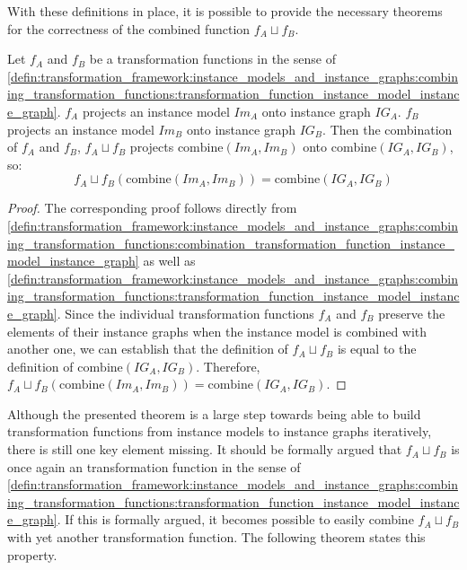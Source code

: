 With these definitions in place, it is possible to provide the necessary theorems for the correctness of the combined function $f_{A} \sqcup f_{B}$.

\begin{thm}
\label{defin:transformation_framework:instance_models_and_instance_graphs:combining_transformation_functions:ig_combine_mapping_correct}
Let $f_A$ and $f_B$ be a transformation functions in the sense of \cref{defin:transformation_framework:instance_models_and_instance_graphs:combining_transformation_functions:transformation_function_instance_model_instance_graph}. $f_A$ projects an instance model $Im_A$ onto instance graph $IG_A$. $f_B$ projects an instance model $Im_B$ onto instance graph $IG_B$. Then the combination of $f_A$ and $f_B$, $f_{A} \sqcup f_{B}$ projects $\mathrm{combine}(Im_A, Im_B)$ onto $\mathrm{combine}(IG_A, IG_B)$, so:
\begin{equation*}
    f_{A} \sqcup f_{B}(\mathrm{combine}(Im_A, Im_B)) = \mathrm{combine}(IG_A, IG_B)
\end{equation*}
\end{thm}

\begin{proof}
The corresponding proof follows directly from \cref{defin:transformation_framework:instance_models_and_instance_graphs:combining_transformation_functions:combination_transformation_function_instance_model_instance_graph} as well as \cref{defin:transformation_framework:instance_models_and_instance_graphs:combining_transformation_functions:transformation_function_instance_model_instance_graph}. Since the individual transformation functions $f_A$ and $f_B$ preserve the elements of their instance graphs when the instance model is combined with another one, we can establish that the definition of $f_{A} \sqcup f_{B}$ is equal to the definition of $\mathrm{combine}(IG_A, IG_B)$. Therefore, $f_{A} \sqcup f_{B}(\mathrm{combine}(Im_A, Im_B)) = \mathrm{combine}(IG_A, IG_B)$.
\end{proof}

Although the presented theorem is a large step towards being able to build transformation functions from instance models to instance graphs iteratively, there is still one key element missing. It should be formally argued that $f_{A} \sqcup f_{B}$ is once again an transformation function in the sense of \cref{defin:transformation_framework:instance_models_and_instance_graphs:combining_transformation_functions:transformation_function_instance_model_instance_graph}. If this is formally argued, it becomes possible to easily combine $f_{A} \sqcup f_{B}$ with yet another transformation function. The following theorem states this property.

